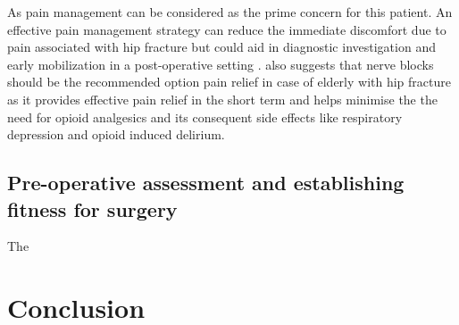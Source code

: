\documentclass[a4paper,man,british]{apa6}
\begin{document}
As pain management can be considered as the prime concern for this patient. An effective pain management strategy can reduce the immediate discomfort due to pain associated with hip fracture but could aid in diagnostic investigation and early mobilization in a post-operative setting \parencite{fernandez_management_2015,monzon_pain_2010}. \textcite{fernandez_management_2015} also suggests that nerve blocks should be the recommended option pain relief in case of elderly with hip fracture as it provides effective pain relief in the short term and helps minimise the the need for opioid analgesics and its consequent side effects like respiratory depression and opioid induced delirium.
\subsection{Pre-operative assessment and establishing fitness for surgery}
The 






\section{} %




\newpage
\section{Conclusion}%



\printbibliography
\end{document}
